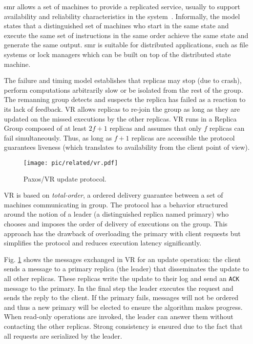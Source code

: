 \gls{smr} allows a set of machines to provide a replicated service, usually to support  availability and reliability characteristics in the system~\cite{Schneider:1990vy}.  
Informally,  the model states that a distinguished set of machines who start in the same state and execute the same set of instructions in the same order achieve the same state  and generate the same output. 
\gls{smr} is suitable for  distributed applications, such as  file systems or lock managers which can  be built on top of the distributed state machine. 

The failure and timing model establishes that replicas may stop (due to crash), perform computations arbitrarily slow or  be isolated from the rest of the group. 
The remanning  group detects and suspects the replica has failed as a reaction to its lack of feedback.
VR allows replicas to re-join the group as long as they are updated on the missed executions by the other replicas.
VR  runs in a Replica Group composed of at least $2f+1$ replicas and assumes that only $f$ replicas can fail simultaneously. 
Thus, as long as $f+1$ replicas are accessible the protocol guarantees liveness (which translates to availability from the client point of view). 

\begin{figure}
\centering
\texttt{[image: pic/related/vr.pdf]}
\caption[Paxos/VR update protocol]{Paxos/VR update protocol.} 
\label{fig:paxos} 
\end{figure}

VR is based on  \emph{total-order}, a ordered delivery guarantee between a set of machines communicating in group. 
The protocol has a behavior structured around the notion of a leader (a distinguished replica named primary) who chooses and imposes the order of delivery of executions on the group. 
This approach has the drawback of overloading the primary with client requests but  simplifies the protocol and reduces execution latency significantly. 


Fig. \ref{fig:paxos} shows the messages exchanged in VR for an update operation: the client sends a message to a primary replica (the leader) that disseminates the update to all other replicas. 
These replicas write the update to their log and send an \texttt{ACK} message to the primary.
In the final step the leader executes the request and sends the reply to the client.
If the primary fails, messages will not be ordered and thus a new primary will be elected to ensure the algorithm makes progress.
When read-only operations are invoked, the leader can answer them without contacting the other replicas.
Strong consistency is ensured due to the fact that all requests are serialized by the leader.


